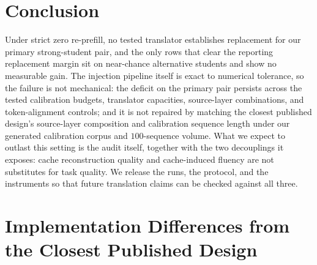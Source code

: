 \documentclass[10pt]{article}
\begin{document}

\section{Conclusion}
\label{sec:conclusion}

Under strict zero re-prefill, no tested translator establishes replacement for
our primary strong-student pair, and the only rows that clear the reporting
replacement margin sit on near-chance alternative students and show no
measurable gain. The injection pipeline itself is exact to numerical
tolerance, so the failure is not mechanical: the deficit on the primary pair
persists across the tested calibration
budgets, translator capacities, source-layer combinations, and token-alignment
controls; and it is not repaired by matching the closest published design's
source-layer composition and calibration sequence length under our generated
calibration corpus and $100$-sequence volume. What we expect to outlast this
setting is the audit itself, together with the two decouplings it exposes: cache
reconstruction quality and cache-induced fluency are not substitutes for task
quality. We release the runs, the protocol, and the instruments so that future
translation claims can be checked against all three.





\appendix

\section{Implementation Differences from the Closest Published Design}
\label{app:impl}

\begin{table}[h]
\centering
\caption{Our implementation of the closest strict-zero-re-prefill design
\citep{heo2026} and where it differs from the reference. Both configurations of
our implementation fail (Table~\ref{tab:main}).}
\label{tab:impl}
\end{table}
\end{document}
